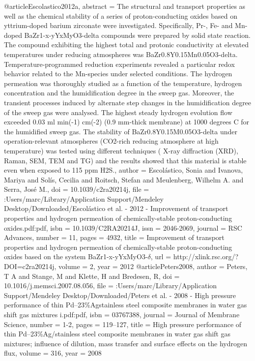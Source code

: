 @article{Escolastico2012a,
abstract = {The structural and transport properties as well as the chemical stability of a series of proton-conducting oxides based on yttrium-doped barium zirconate were investigated. Specifically, Pr-, Fe- and Mn-doped BaZr1-x-yYxMyO3-delta compounds were prepared by solid state reaction. The compound exhibiting the highest total and protonic conductivity at elevated temperatures under reducing atmospheres was BaZr0.8Y0.15Mn0.05O3-delta. Temperature-programmed reduction experiments revealed a particular redox behavior related to the Mn-species under selected conditions. The hydrogen permeation was thoroughly studied as a function of the temperature, hydrogen concentration and the humidification degree in the sweep gas. Moreover, the transient processes induced by alternate step changes in the humidification degree of the sweep gas were analysed. The highest steady hydrogen evolution flow exceeded 0.03 ml min(-1) cm(-2) (0.9 mm-thick membrane) at 1000 degrees C for the humidified sweep gas. The stability of BaZr0.8Y0.15M0.05O3-delta under operation-relevant atmospheres (CO2-rich reducing atmosphere at high temperature) was tested using different techniques ( X-ray diffraction (XRD), Raman, SEM, TEM and TG) and the results showed that this material is stable even when exposed to 115 ppm H2S.},
author = {Escol{\'{a}}stico, Sonia and Ivanova, Mariya and Sol{\'{i}}s, Cecilia and Roitsch, Stefan and Meulenberg, Wilhelm A. and Serra, Jos{\'{e}} M.},
doi = {10.1039/c2ra20214j},
file = {:Users/marc/Library/Application Support/Mendeley Desktop/Downloaded/Escol{\'{a}}stico et al. - 2012 - Improvement of transport properties and hydrogen permeation of chemically-stable proton-conducting oxides.pdf:pdf},
isbn = {10.1039/C2RA20214J},
issn = {2046-2069},
journal = {RSC Advances},
number = {11},
pages = {4932},
title = {{Improvement of transport properties and hydrogen permeation of chemically-stable proton-conducting oxides based on the system BaZr1-x-yYxMyO3-$\delta$}},
url = {http://xlink.rsc.org/?DOI=c2ra20214j},
volume = {2},
year = {2012}
}
@article{Peters2008,
author = {Peters, T A and Stange, M and Klette, H and Bredesen, R},
doi = {10.1016/j.memsci.2007.08.056},
file = {:Users/marc/Library/Application Support/Mendeley Desktop/Downloaded/Peters et al. - 2008 - High pressure performance of thin Pd–23{\%}Agstainless steel composite membranes in water gas shift gas mixtures i.pdf:pdf},
isbn = {03767388},
journal = {Journal of Membrane Science},
number = {1-2},
pages = {119--127},
title = {{High pressure performance of thin Pd–23{\%}Ag/stainless steel composite membranes in water gas shift gas mixtures; influence of dilution, mass transfer and surface effects on the hydrogen flux}},
volume = {316},
year = {2008}
}
